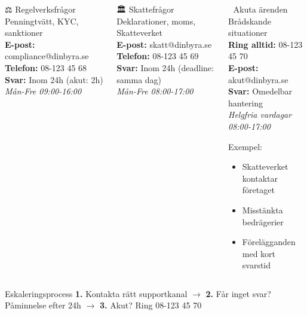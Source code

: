 \documentclass[10pt]{beamer}
\begin{document}
\begin{frame}[fragile]
\begin{columns}[T]
  \vspace{0.3cm}

  \begin{block}{⚖️ Regelverksfrågor}
    \footnotesize
    Penningtvätt, KYC, sanktioner\\
    \textbf{E-post:} compliance@dinbyra.se\\
    \textbf{Telefon:} 08-123 45 68\\
    \textbf{Svar:} Inom 24h (akut: 2h)\\
    \textit{Mån-Fre 09:00-16:00}
  \end{block}

  
  \begin{block}{🏛️ Skattefrågor}
    \footnotesize
    Deklarationer, moms, Skatteverket\\
    \textbf{E-post:} skatt@dinbyra.se\\
    \textbf{Telefon:} 08-123 45 69\\
    \textbf{Svar:} Inom 24h (deadline: samma dag)\\
    \textit{Mån-Fre 08:00-17:00}
  \end{block}

  \vspace{0.3cm}

  \begin{block}{🚨 Akuta ärenden}
    \footnotesize
    Brådskande situationer\\
    \textbf{Ring alltid:} 08-123 45 70\\
    \textbf{E-post:} akut@dinbyra.se\\
    \textbf{Svar:} Omedelbar hantering\\
    \textit{Helgfria vardagar 08:00-17:00}
    
    \vspace{0.2cm}
    Exempel:
    \begin{itemize}
      \item Skatteverket kontaktar företaget
      \item Misstänkta bedrägerier
      \item Förelägganden med kort svarstid
    \end{itemize}
  \end{block}

  \end{columns}

  \vspace{0.4cm}

  \begin{block}{Eskaleringsprocess}
    \footnotesize
    \textbf{1.} Kontakta rätt supportkanal $\rightarrow$ 
    \textbf{2.} Får inget svar? Påminnelse efter 24h $\rightarrow$ 
    \textbf{3.} Akut? Ring 08-123 45 70
  \end{block}


\end{frame}
\end{document}
